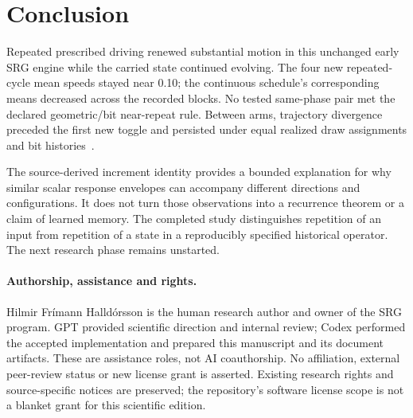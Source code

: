 \documentclass[11pt,a4paper]{article}
\begin{document}
\section{Conclusion}
\label{sec:conclusion}
Repeated prescribed driving renewed substantial motion in this unchanged early SRG engine while the carried state continued evolving. The four new repeated-cycle mean speeds stayed near 0.10; the continuous schedule's corresponding means decreased across the recorded blocks. No tested same-phase pair met the declared geometric/bit near-repeat rule. Between arms, trajectory divergence preceded the first new toggle and persisted under equal realized draw assignments and bit histories~\cite{sim02,review,additional}.

The source-derived increment identity provides a bounded explanation for why similar scalar response envelopes can accompany different directions and configurations. It does not turn those observations into a recurrence theorem or a claim of learned memory. The completed study distinguishes repetition of an input from repetition of a state in a reproducibly specified historical operator. The next research phase remains unstarted.

\paragraph{Authorship, assistance and rights.}
Hilmir Fr\'imann Halld\'orsson is the human research author and owner of the SRG program. GPT provided scientific direction and internal review; Codex performed the accepted implementation and prepared this manuscript and its document artifacts. These are assistance roles, not AI coauthorship. No affiliation, external peer-review status or new license grant is asserted. Existing research rights and source-specific notices are preserved; the repository's software license scope is not a blanket grant for this scientific edition.
\end{document}
